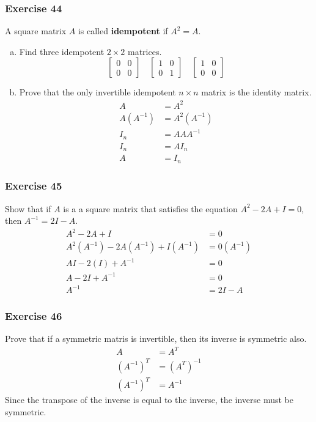 \documentclass{math}
\begin{document}
\subsubsection*{Exercise 44}
A square matrix \( A \) is called \textbf{idempotent} if \( A^2 = A \).
\begin{enumerate}[(a)]
  \item Find three idempotent \( 2\times2 \) matrices.
  \[ \begin{bmatrix}0 & 0 \\ 0 & 0\end{bmatrix} \quad
    \begin{bmatrix}1 & 0 \\ 0 & 1\end{bmatrix} \quad
    \begin{bmatrix}1 & 0 \\ 0 & 0\end{bmatrix} \]
  \item Prove that the only invertible idempotent \( n\times n \) matrix is the
  identity matrix.
  \begin{align*}
    A &= A^2 \\
    A(A^{-1}) &= A^2(A^{-1}) \\
    I_n &= AAA^{-1} \\
    I_n &= AI_n \\
    A &= I_n
  \end{align*}
\end{enumerate}

\subsubsection*{Exercise 45}
Show that if \( A \) is a a square matrix that satisfies the equation
\( A^2-2A+I = 0 \), then \( A^{-1} = 2I-A \).
\begin{align*}
  A^2-2A+I &= 0 \\
  A^2(A^{-1})-2A(A^{-1})+I(A^{-1}) &= 0(A^{-1}) \\
  AI-2(I)+A^{-1} &= 0 \\
  A-2I+A^{-1} &= 0 \\
  A^{-1} &= 2I-A
\end{align*}

\subsubsection*{Exercise 46}
Prove that if a symmetric matris is invertible, then its inverse is symmetric
also.
\begin{align*}
  A &= A^T \\
  (A^{-1})^T &= (A^T)^{-1} \\
  (A^{-1})^T &= A^{-1}
\end{align*}
Since the transpose of the inverse is equal to the inverse, the inverse must be
symmetric.
\end{document}
